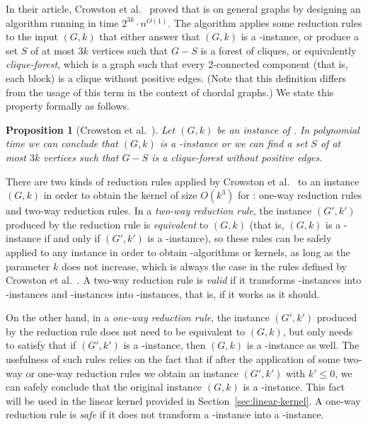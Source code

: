 \documentclass[
final
]{dmtcs-episciences}
\newtheorem{proposition}{Proposition}{\bfseries}{\itshape}
\begin{document}
	In their article, Crowston et al.~\cite{crowston2013maximum} proved that {} is {} on general graphs by designing an algorithm  running in  time $2^{3k}\cdot n^{O(1)}$. The algorithm applies some reduction rules to the input $(G,k)$ that either answer that $(G,k)$ is a {}-instance,  or produce a set $S$ of at most $3k$ vertices such that $G-S$ is a forest of cliques, or equivalently \emph{clique-forest}, which is a graph such that every 2-connected component (that is, each block) is a clique without positive edges. (Note that this definition differs from the usage of this term in the context of chordal graphs.) We state this property formally as follows.

\begin{proposition}[Crowston et al.~\cite{crowston2013maximum}]
\label{coro4.1}\label{coroker}
Let $(G,k)$ be an instance of {}. In polynomial time we can conclude that $(G,k)$ is a {}-instance or we can find a set $S$ of at most $3k$ vertices such that $G-S$ is a clique-forest without positive edges.
\end{proposition}



	There are two kinds of reduction rules applied by Crowston et al.~\cite{crowston2013maximum} to an instance $(G,k)$ in order to obtain the kernel of size $O(k^3)$ for {}: one-way reduction rules and two-way reduction rules. In a \emph{two-way reduction rule}, the instance $(G',k')$ produced by the reduction rule is {\sl equivalent} to $(G,k)$ (that is, $(G,k)$ is a {}-instance if and only if
$(G',k')$ is a {}-instance), so these rules can be safely applied to any instance in order to obtain {}-algorithms or kernels, as long as the parameter $k$ does not increase, which is always the case in the rules defined by Crowston et al.~\cite{crowston2013maximum}. A two-way reduction rule is {\it{valid}} if it transforms {}-instances into {}-instances and {}-instances into {}-instances, that is, if it works as it should.


 On the other hand, in a \emph{one-way reduction rule}, the instance $(G',k')$ produced by the reduction rule does not need to be equivalent to $(G,k)$, but only needs to satisfy that if $(G',k')$ is a {}-instance, then $(G,k)$ is a {}-instance as well. The usefulness of such rules relies on the fact that if after the application of some two-way or one-way reduction rules we obtain an instance $(G',k')$ with $k' \leq 0$, we can safely conclude that the original instance $(G,k)$ is a {}-instance. This fact will be used in the linear kernel provided in Section~\ref{sec:linear-kernel}. A one-way reduction rule is {\it{safe}} if it does not transform a {}-instance into a {}-instance.
\end{document}
